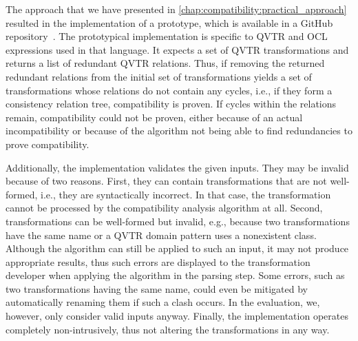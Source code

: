 The approach that we have presented in \autoref{chap:compatibility:practical_approach} resulted in the implementation of a prototype, which is available in a GitHub repository~\cite{decompositionGithub}.
%
The prototypical implementation is specific to \gls{QVTR} and \gls{OCL} expressions used in that language.
It expects a set of \gls{QVTR} transformations and returns a list of redundant \gls{QVTR} relations.
Thus, if removing the returned redundant relations from the initial set of transformations yields a set of transformations whose relations do not contain any cycles, i.e., if they form a consistency relation tree, compatibility is proven.
If cycles within the relations remain, compatibility could not be proven, either because of an actual incompatibility or because of the algorithm not being able to find redundancies to prove compatibility.

Additionally, the implementation validates the given inputs.
They may be invalid because of two reasons.
First, they can contain transformations that are not well-formed, i.e., they are syntactically incorrect. In that case, the transformation cannot be processed by the compatibility analysis algorithm at all.
Second, transformations can be well-formed but invalid, e.g., because two transformations have the same name or a \gls{QVTR} domain pattern uses a nonexistent class.
Although the algorithm can still be applied to such an input, it may not produce appropriate results, thus such errors are displayed to the transformation developer when applying the algorithm in the parsing step.
Some errors, such as two transformations having the same name, could even be mitigated by automatically renaming them if such a clash occurs.
In the evaluation, we, however, only consider valid inputs anyway.
Finally, the implementation operates completely non-intrusively, thus not altering the transformations in any way.

